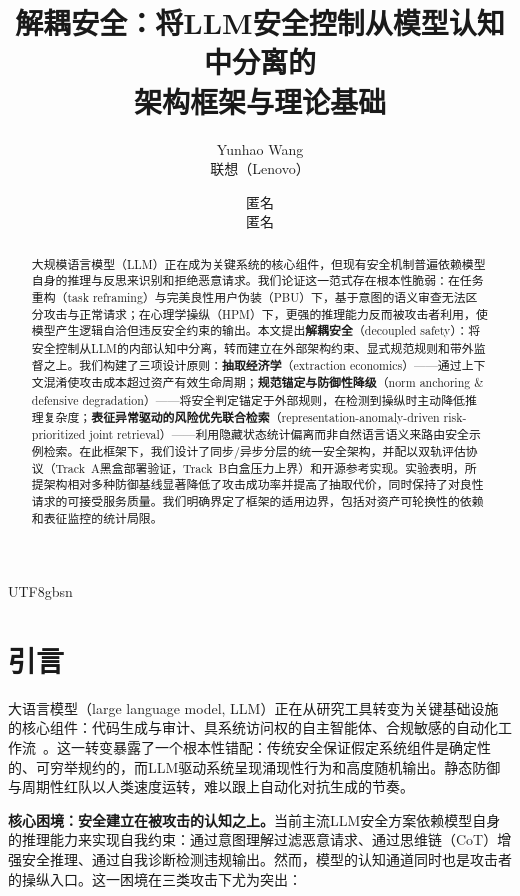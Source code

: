 \documentclass[letterpaper,twocolumn,10pt]{article}
\title{\Large \bf 解耦安全：将LLM安全控制从模型认知中分离的\\
  架构框架与理论基础}
\author{
Yunhao Wang\\
联想（Lenovo） \and
匿名\\
匿名
}
\date{}
\begin{document}
\begin{CJK}{UTF8}{gbsn}
\maketitle

\begin{abstract}
大规模语言模型（LLM）正在成为关键系统的核心组件，但现有安全机制普遍依赖模型自身的推理与反思来识别和拒绝恶意请求。我们论证这一范式存在根本性脆弱：在任务重构（task reframing）与完美良性用户伪装（PBU）下，基于意图的语义审查无法区分攻击与正常请求；在心理学操纵（HPM）下，更强的推理能力反而被攻击者利用，使模型产生逻辑自洽但违反安全约束的输出。本文提出\textbf{解耦安全}（decoupled safety）：将安全控制从LLM的内部认知中分离，转而建立在外部架构约束、显式规范规则和带外监督之上。我们构建了三项设计原则：\textbf{抽取经济学}（extraction economics）——通过上下文混淆使攻击成本超过资产有效生命周期；\textbf{规范锚定与防御性降级}（norm anchoring \& defensive degradation）——将安全判定锚定于外部规则，在检测到操纵时主动降低推理复杂度；\textbf{表征异常驱动的风险优先联合检索}（representation-anomaly-driven risk-prioritized joint retrieval）——利用隐藏状态统计偏离而非自然语言语义来路由安全示例检索。在此框架下，我们设计了同步/异步分层的统一安全架构，并配以双轨评估协议（Track~A黑盒部署验证，Track~B白盒压力上界）和开源参考实现。实验表明，所提架构相对多种防御基线显著降低了攻击成功率并提高了抽取代价，同时保持了对良性请求的可接受服务质量。我们明确界定了框架的适用边界，包括对资产可轮换性的依赖和表征监控的统计局限。
\end{abstract}

\section{引言}
\label{sec:intro}

大语言模型（large language model, LLM）正在从研究工具转变为关键基础设施的核心组件：代码生成与审计、具系统访问权的自主智能体、合规敏感的自动化工作流~\cite{sisf-arxiv,agentos-arxiv}。这一转变暴露了一个根本性错配：传统安全保证假定系统组件是确定性的、可穷举规约的，而LLM驱动系统呈现涌现性行为和高度随机输出。静态防御与周期性红队以人类速度运转，难以跟上自动化对抗生成的节奏。

\textbf{核心困境：安全建立在被攻击的认知之上。}当前主流LLM安全方案依赖模型自身的推理能力来实现自我约束：通过意图理解过滤恶意请求、通过思维链（CoT）增强安全推理、通过自我诊断检测违规输出。然而，模型的认知通道同时也是攻击者的操纵入口。这一困境在三类攻击下尤为突出：


\end{CJK}
\end{document}
